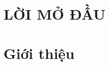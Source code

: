 

\newcommand{\tab}{\hspace{\parindent}}

\begin{titlepage}
\bordertitle
\begin{center}
\vspace{\fill} \maintitle \\ \vspace{\fill} \bottitle
\end{center}
\end{titlepage}
\newpage
{}
\tableofcontents
\thispagestyle{empty}
\newpage
\chapter*{ LỜI MỞ ĐẦU }
\thispagestyle{empty}
\vspace{\fill}
\begin{itemize}
\end{itemize}
\vspace{\fill}
\newpage
\setcounter{page}{1}
\chapter{ Giới thiệu }

